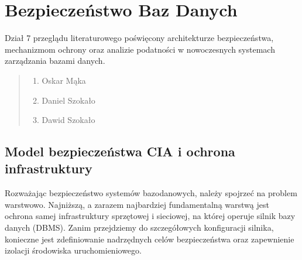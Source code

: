 \documentclass[a4paper,11pt,english,openany,oneside]{sphinxmanual}
\begin{document}
\section{Bezpieczeństwo Baz Danych}
\label{\detokenize{rozdzial_2/rozdzial_27/index:bezpieczenstwo-baz-danych}}\label{\detokenize{rozdzial_2/rozdzial_27/index::doc}}
\sphinxAtStartPar
Dział 7 przeglądu literaturowego poświęcony architekturze bezpieczeństwa, mechanizmom ochrony oraz analizie podatności w nowoczesnych systemach zarządzania bazami danych.
\begin{quote}\begin{description}
\begin{enumerate}
%
\item {} 
\sphinxAtStartPar
Oskar Mąka

\item {} 
\sphinxAtStartPar
Daniel Szokało

\item {} 
\sphinxAtStartPar
Dawid Szokało

\end{enumerate}

\end{description}\end{quote}

\sphinxstepscope


\subsection{Model bezpieczeństwa CIA i ochrona infrastruktury}
\label{\detokenize{rozdzial_2/rozdzial_27/rozdzial_1:model-bezpieczenstwa-cia-i-ochrona-infrastruktury}}\label{\detokenize{rozdzial_2/rozdzial_27/rozdzial_1::doc}}
\sphinxAtStartPar
Rozważając bezpieczeństwo systemów bazodanowych, należy spojrzeć na problem warstwowo. Najniższą, a zarazem najbardziej fundamentalną warstwą jest ochrona samej infrastruktury sprzętowej i sieciowej, na której operuje silnik bazy danych (DBMS). Zanim przejdziemy do szczegółowych konfiguracji silnika, konieczne jest zdefiniowanie nadrzędnych celów bezpieczeństwa oraz zapewnienie izolacji środowiska uruchomieniowego.
\end{document}
